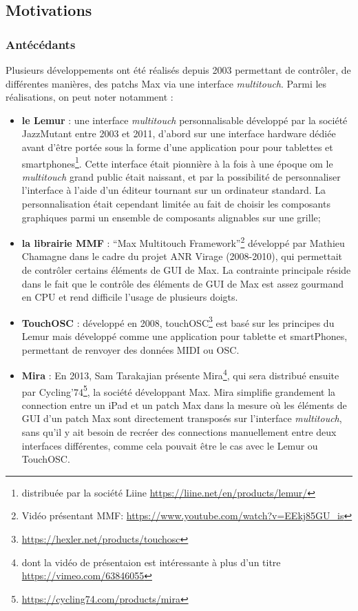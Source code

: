 \subsection{Motivations}

\subsubsection{Antécédants} 

\noindent Plusieurs développements ont été réalisés depuis 2003 permettant de contrôler, de différentes manières, des patchs Max via une interface \textit{multitouch}. Parmi les réalisations, on peut noter notamment :
\vspace{-1em}
\begin{itemize}[noitemsep]
	\item \textbf{le Lemur} : une interface \textit{multitouch} personnalisable développé par la société JazzMutant entre 2003 et 2011, d'abord sur une interface hardware dédiée avant d'être portée sous la forme d'une application pour pour tablettes et smartphones\footnote{distribuée par la société Liine \url{https://liine.net/en/products/lemur/}}. Cette interface était pionnière à la fois à une époque om le \textit{multitouch} grand public était naissant, et par la possibilité de personnaliser l'interface à l'aide d'un éditeur tournant sur un ordinateur standard. La personnalisation était cependant limitée au fait de choisir les composants graphiques parmi un ensemble de composants alignables sur une grille;

	\item \textbf{la librairie MMF} : ``Max Multitouch Framework''\footnote{Vidéo présentant MMF: \url{https://www.youtube.com/watch?v=EEkj85GU_is}} développé par Mathieu Chamagne dans le cadre du projet \gls{ANR} Virage (2008-2010), qui permettait de contrôler certains éléments de \gls{GUI} de Max. La contrainte principale réside dans le fait que le contrôle des éléments de \gls{GUI} de Max est assez gourmand en \gls{CPU} et rend difficile l'usage de plusieurs doigts.

	\item \textbf{TouchOSC} : développé en 2008, touchOSC\footnote{\url{https://hexler.net/products/touchosc}} est basé sur les principes du Lemur mais développé comme une application pour tablette et smartPhones, permettant de renvoyer des données \gls{MIDI} ou \gls{OSC}.

	\item \textbf{Mira} : En 2013, Sam Tarakajian présente Mira\footnote{dont la vidéo de présentaion est intéressante à plus d'un titre \url{https://vimeo.com/63846055}}, qui sera distribué ensuite par Cycling'74\footnote{\url{https://cycling74.com/products/mira}}, la société développant Max. Mira simplifie grandement la connection entre un iPad et un patch Max dans la mesure où les éléments de \gls{GUI} d'un patch Max sont directement transposés sur l'interface \textit{multitouch}, sans qu'il y ait besoin de recréer des connections manuellement entre deux interfaces différentes, comme cela pouvait être le cas avec le Lemur ou TouchOSC.


\end{itemize}
